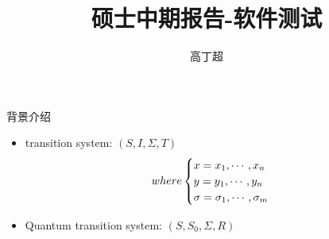 \documentclass[aspectratio=1610]{beamer}
\title[program test]{硕士中期报告-软件测试}
\author[Gcc]{高丁超}
\institute[ISCAS]{Institute of Software Chinese Academy of Sciences}
\begin{document}
\begin{frame}[plain]
  \titlepage
\end{frame}
\begin{frame}{背景介绍}
    \begin{itemize}
        \Large
        \item  transition system: $(S, I, \Sigma, T)$
        \begin{equation}
          where
          \begin{cases}
            x = x_1, \cdots, x_n\\
            y = y_1, \cdots, y_n\\
            \sigma = \sigma_1, \cdots, \sigma_m
          \end{cases}
          \notag
        \end{equation}
        \item Quantum transition system: $(S, S_0, \Sigma, R)$
    \end{itemize}
\end{frame}
\end{document}
